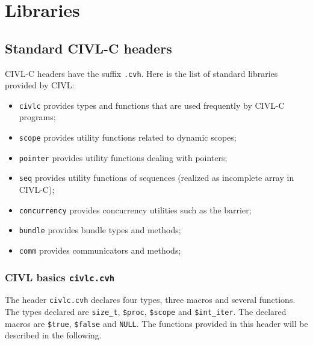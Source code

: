 




\chapter{Libraries}

\section{Standard CIVL-C headers}
CIVL-C headers have the suffix \texttt{.cvh}. Here is the list of standard libraries provided by CIVL:
\begin{itemize}
\item \texttt{civlc} provides types and functions that are used frequently by CIVL-C programs; 
\item \texttt{scope} provides utility functions related to dynamic scopes;
\item \texttt{pointer} provides utility functions dealing with pointers;
\item \texttt{seq} provides utility functions of sequences (realized as incomplete array in CIVL-C);
\item \texttt{concurrency} provides concurrency utilities such as the barrier;
\item \texttt{bundle} provides bundle types and methods;
\item \texttt{comm} provides communicators and methods;
\end{itemize}

\subsection{CIVL basics \texttt{civlc.cvh}}
\label{subsec:civlcLibrary}
The header \texttt{civlc.cvh} declares four types, three macros and  several functions. The types declared are \texttt{size\_t}, \texttt{\$proc},
\texttt{\$scope} and \texttt{\$int\_iter}. The declared macros are \texttt{\$true}, \texttt{\$false} and \texttt{NULL}. The functions provided in this header
will be described in the following.

